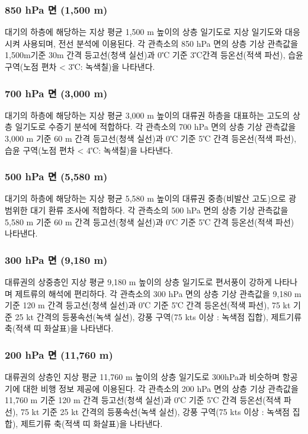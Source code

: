 \subsubsection{850 hPa 면 (1,500 m)}
대기의 하층에 해당하는 지상 평균 1,500 m 높이의 상층 일기도로 지상 일기도와 대응시켜 사용되며, 전선 분석에 이용된다. 각 관측소의 850 hPa 면의 상층 기상 관측값을 1,500m기준 30m 간격 등고선(청색 실선)과 0℃ 기준 3℃간격 등온선(적색 파선), 습윤 구역(노점 편차 < 3℃: 녹색칠)을 나타낸다.

\subsubsection{700 hPa 면 (3,000 m)}
대기의 하층에 해당하는 지상 평균 3,000 m 높이의 대류권 하층을 대표하는 고도의 상층 일기도로 수증기 분석에 적합하다. 각 관측소의 700 hPa 면의 상층 기상 관측값을 3,000 m 기준 60 m 간격 등고선(청색 실선)과 0℃ 기준 5℃ 간격 등온선(적색 파선), 습윤 구역(노점 편차 < 4℃: 녹색칠)을 나타낸다. 

\subsubsection{500 hPa 면 (5,580 m)}
대기의 하층에 해당하는 지상 평균 5,580 m 높이의 대류권 중층(비발산 고도)으로 광범위한 대기 환류 조사에 적합하다. 각 관측소의 500 hPa 면의 상층 기상 관측값을 5,580 m 기준 60 m 간격 등고선(청색 실선)과 0℃ 기준 5℃ 간격 등온선(적색 파선) 나타낸다. 

\subsubsection{300 hPa 면 (9,180 m)}
대류권의 상중층인 지상 평균 9,180 m 높이의 상층 일기도로 편서풍이 강하게 나타나며 제트류의 해석에 편리하다. 각 관측소의 300 hPa 면의 상층 기상 관측값을 9,180 m 기준 120 m 간격 등고선(청색 실선)과 0℃ 기준 5℃ 간격 등온선(적색 파선), 75 kt 기준 25 kt 간격의 등풍속선(녹색 실선), 강풍 구역(75 kts 이상 :  녹색점 집합), 제트기류 축(적색 띠 화살표)을 나타낸다. 

\subsubsection{200 hPa 면 (11,760 m)}
대류권의 상층인 지상 평균 11,760 m 높이의 상층 일기도로 300hPa과 비슷하며 항공기에 대한 비행 정보 제공에 이용된다. 각 관측소의 200 hPa 면의 상층 기상 관측값을 11,760 m 기준 120 m 간격 등고선(청색 실선)과 0℃ 기준 5℃ 간격 등온선(적색 파선), 75 kt 기준 25 kt 간격의 등풍속선(녹색 실선), 강풍 구역(75 kts 이상 :  녹색점 집합), 제트기류 축(적색 띠 화살표)을 나타낸다. 

